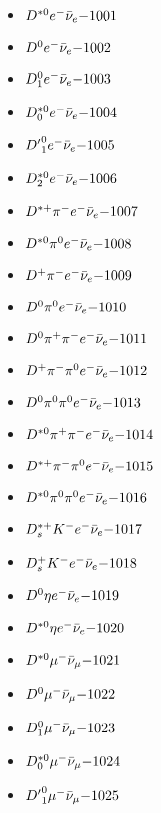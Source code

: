 
 \begin{multicols}{3} 
 \begin{itemize}
 \item $ D^{*0} e^{-} \bar{\nu}_{e} \hfill{-1001}$
 \item $ D^{0} e^{-} \bar{\nu}_{e} \hfill{-1002}$
 \item $ D_{1}^{0} e^{-} \bar{\nu}_{e} \hfill{-1003}$
 \item $ D_{0}^{*0} e^{-} \bar{\nu}_{e} \hfill{-1004}$
 \item $ {D^{\prime}}_{1}^{0} e^{-} \bar{\nu}_{e} \hfill{-1005}$
 \item $ D_{2}^{*0} e^{-} \bar{\nu}_{e} \hfill{-1006}$
 \item $ D^{*+} \pi^{-} e^{-} \bar{\nu}_{e} \hfill{-1007}$
 \item $ D^{*0} \pi^{0} e^{-} \bar{\nu}_{e} \hfill{-1008}$
 \item $ D^{+} \pi^{-} e^{-} \bar{\nu}_{e} \hfill{-1009}$
 \item $ D^{0} \pi^{0} e^{-} \bar{\nu}_{e} \hfill{-1010}$
 \item $ D^{0} \pi^{+} \pi^{-} e^{-} \bar{\nu}_{e} \hfill{-1011}$
 \item $ D^{+} \pi^{-} \pi^{0} e^{-} \bar{\nu}_{e} \hfill{-1012}$
 \item $ D^{0} \pi^{0} \pi^{0} e^{-} \bar{\nu}_{e} \hfill{-1013}$
 \item $ D^{*0} \pi^{+} \pi^{-} e^{-} \bar{\nu}_{e} \hfill{-1014}$
 \item $ D^{*+} \pi^{-} \pi^{0} e^{-} \bar{\nu}_{e} \hfill{-1015}$
 \item $ D^{*0} \pi^{0} \pi^{0} e^{-} \bar{\nu}_{e} \hfill{-1016}$
 \item $ D_{s}^{*+} K^{-} e^{-} \bar{\nu}_{e} \hfill{-1017}$
 \item $ D_{s}^{+} K^{-} e^{-} \bar{\nu}_{e} \hfill{-1018}$
 \item $ D^{0} \eta e^{-} \bar{\nu}_{e} \hfill{-1019}$
 \item $ D^{*0} \eta e^{-} \bar{\nu}_{e} \hfill{-1020}$
 \item $ D^{*0} \mu^{-} \bar{\nu}_{\mu} \hfill{-1021}$
 \item $ D^{0} \mu^{-} \bar{\nu}_{\mu} \hfill{-1022}$
 \item $ D_{1}^{0} \mu^{-} \bar{\nu}_{\mu} \hfill{-1023}$
 \item $ D_{0}^{*0} \mu^{-} \bar{\nu}_{\mu} \hfill{-1024}$
 \item $ {D^{\prime}}_{1}^{0} \mu^{-} \bar{\nu}_{\mu} \hfill{-1025}$

\end{itemize}
\end{multicols}
